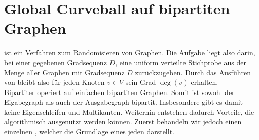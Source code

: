 
\section{Global Curveball auf bipartiten Graphen}
\label{sec:global_curveball}
\gc{} ist ein Verfahren zum Randomisieren von Graphen.
Die Aufgabe liegt also darin, bei einer gegebenen Gradsequenz $D$, eine uniform verteilte Stichprobe
aus der Menge aller Graphen mit Gradsequenz $D$ zurückzugeben. Durch das Ausführen von \gc{} 
bleibt also für jeden Knoten $v\in V$ sein Grad $\deg(v)$ erhalten. 
\\

Bipartiter \gc{} operiert auf einfachen bipartiten Graphen. Somit ist sowohl der Eigabegraph als auch
der Ausgabegraph bipartit. Insbesondere gibt es damit keine Eigenschleifen und Multikanten.
Weiterhin entstehen dadurch 
Vorteile, die algorithmisch ausgenutzt werden können. Zuerst behandeln wir jedoch einen einzelnen \cb{}, welcher
die Grundlage eines jeden \gc{} darstellt.
\\


